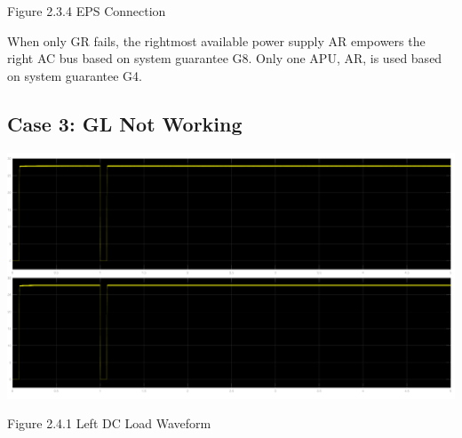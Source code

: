 \documentclass{mcmthesis}
\begin{document}
\begin{center}
\small{Figure 2.3.4 EPS Connection}
\end{center}
When only GR fails,  the rightmost available power supply AR empowers the right AC bus based on system guarantee G8. Only one APU, AR, is used based on system guarantee G4.
\pagebreak

\subsection{Case 3: GL Not Working}
\begin{center}
\includegraphics[trim= 0 0.28\imageheight{} 0 0, clip, width = 0.165\imageheight{}]{gl_down_load1.png}
\end{center}
\begin{center}
\small{Figure 2.4.1 Left DC Load Waveform}
\end{center}
\end{document}
